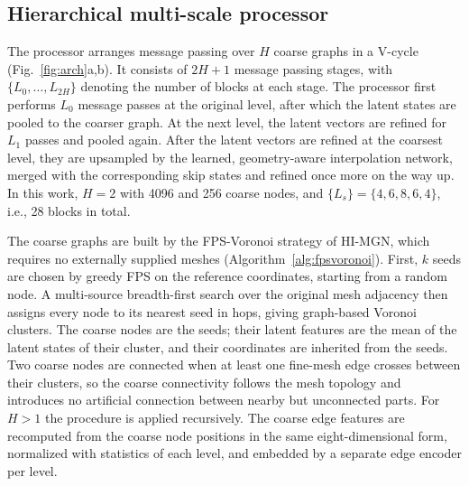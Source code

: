 \documentclass[preprint,12pt]{elsarticle}
\begin{document}
\subsection{Hierarchical multi-scale processor}\label{sec:vcycle}

The processor arranges message passing over $H$ coarse graphs in a V-cycle (Fig.~\ref{fig:arch}a,b). It consists of
$2H{+}1$ message passing stages, with $\{L_0,\dots,L_{2H}\}$ denoting the number of blocks at each
stage. The processor first performs $L_0$ message passes at the original level, after which the
latent states are pooled to the coarser graph. At the next level, the latent vectors are refined
for $L_1$ passes and pooled again. After the latent vectors are refined at the coarsest level,
they are upsampled by the learned, geometry-aware interpolation network, merged with the
corresponding skip states and refined once more on the way up. In this work, $H=2$ with 4096 and
256 coarse nodes, and $\{L_s\}=\{4,6,8,6,4\}$, i.e., 28 blocks in total.

The coarse graphs are built by the FPS-Voronoi strategy of HI-MGN, which requires no externally
supplied meshes (Algorithm~\ref{alg:fpsvoronoi}). First, $k$ seeds are chosen by greedy FPS on
the reference coordinates, starting from a random node. A multi-source breadth-first search over
the original mesh adjacency then assigns every node to its nearest seed in hops, giving
graph-based Voronoi clusters. The coarse nodes are the seeds; their latent features are the mean
of the latent states of their cluster, and their coordinates are inherited from the seeds. Two
coarse nodes are connected when at least one fine-mesh edge crosses between their clusters, so
the coarse connectivity follows the mesh topology and introduces no artificial connection between
nearby but unconnected parts. For $H>1$ the procedure is applied recursively. The coarse edge
features are recomputed from the coarse node positions in the same eight-dimensional form,
normalized with statistics of each level, and embedded by a separate edge encoder per level.
\end{document}
